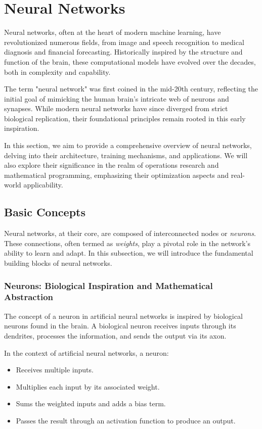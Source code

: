 \section{Neural Networks}


Neural networks, often at the heart of modern machine learning, have revolutionized numerous fields, from image and speech recognition to medical diagnosis and financial forecasting. Historically inspired by the structure and function of the brain, these computational models have evolved over the decades, both in complexity and capability. 

The term "neural network" was first coined in the mid-20th century, reflecting the initial goal of mimicking the human brain's intricate web of neurons and synapses. While modern neural networks have since diverged from strict biological replication, their foundational principles remain rooted in this early inspiration.

In this section, we aim to provide a comprehensive overview of neural networks, delving into their architecture, training mechanisms, and applications. We will also explore their significance in the realm of operations research and mathematical programming, emphasizing their optimization aspects and real-world applicability.

\subsection{Basic Concepts}

Neural networks, at their core, are composed of interconnected nodes or \textit{neurons}. These connections, often termed as \textit{weights}, play a pivotal role in the network's ability to learn and adapt. In this subsection, we will introduce the fundamental building blocks of neural networks.

\subsubsection{Neurons: Biological Inspiration and Mathematical Abstraction}

The concept of a neuron in artificial neural networks is inspired by biological neurons found in the brain. A biological neuron receives inputs through its dendrites, processes the information, and sends the output via its axon.

In the context of artificial neural networks, a neuron:
\begin{itemize}
    \item Receives multiple inputs.
    \item Multiplies each input by its associated weight.
    \item Sums the weighted inputs and adds a bias term.
    \item Passes the result through an activation function to produce an output.
\end{itemize}

